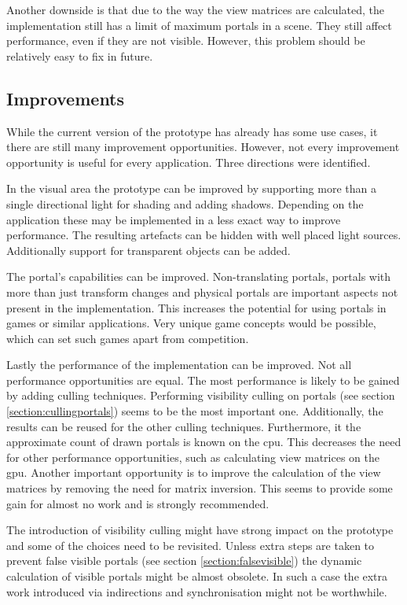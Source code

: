 Another downside is that due to the way the view matrices are calculated, the implementation still has a limit of maximum portals in a scene. They still affect performance, even if they are not visible. However, this problem should be relatively easy to fix in future.


\subsection{Improvements}

While the current version of the prototype has already has some use cases, it there are still many improvement opportunities. However, not every improvement opportunity is useful for every application. Three directions were identified.

In the visual area the prototype can be improved by supporting more than a single directional light for shading and adding shadows. Depending on the application these may be implemented in a less exact way to improve performance. The resulting artefacts can be hidden with well placed light sources. Additionally support for transparent objects can be added.

The portal's capabilities can be improved. Non-translating portals, portals with more than just transform changes and physical portals are important aspects not present in the implementation. This increases the potential for using portals in games or similar applications. Very unique game concepts would be possible, which can set such games apart from competition.

Lastly the performance of the implementation can be improved. Not all performance opportunities are equal. The most performance is likely to be gained by adding culling techniques. Performing visibility culling on portals (see section \ref{section:cullingportals}) seems to be the most important one. Additionally, the results can be reused for the other culling techniques. Furthermore, it the approximate count of drawn portals is known on the \gls{cpu}. This decreases the need for other performance opportunities, such as calculating view matrices on the \gls{gpu}. Another important opportunity is to improve the calculation of the view matrices by removing the need for matrix inversion. This seems to provide some gain for almost no work and is strongly recommended.

The introduction of visibility culling might have strong impact on the prototype and some of the choices need to be revisited. Unless extra steps are taken to prevent false visible portals (see section \ref{section:falsevisible}) the dynamic calculation of visible portals might be almost obsolete. In such a case the extra work introduced via indirections and synchronisation might not be worthwhile.

